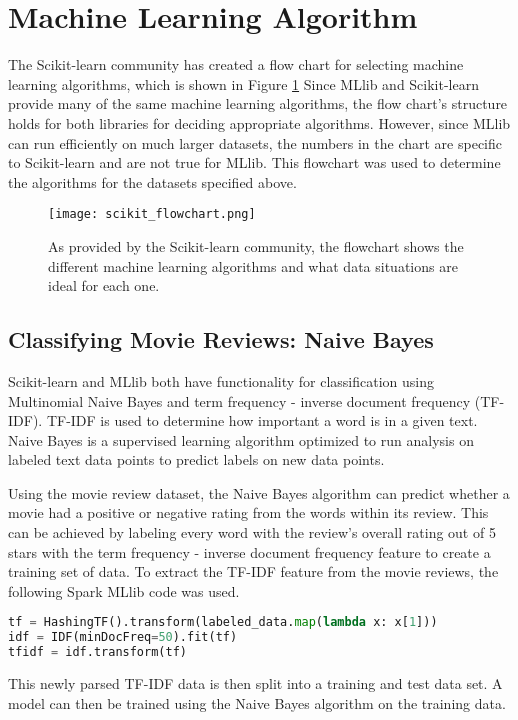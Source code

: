 \documentclass[9pt,twocolumn,twoside]{idsi}
\begin{document}
\section{Machine Learning Algorithm}
The Scikit-learn community has created a flow chart for selecting machine learning algorithms, which is shown in Figure \ref{fig:flowchart} \cite{scimap} Since MLlib and Scikit-learn provide many of the same machine learning algorithms, the flow chart's structure holds for both libraries for deciding appropriate algorithms. However, since MLlib can run efficiently on much larger datasets, the numbers in the chart are specific to Scikit-learn and are not true for MLlib. This flowchart was used to determine the algorithms for the datasets specified above. 
\begin{figure}[htbp]
\centering
\texttt{[image: scikit\_flowchart.png]}
\caption{As provided by the Scikit-learn community, the flowchart shows the different machine learning algorithms and what data situations are ideal for each one.}
\label{fig:flowchart}
\end{figure}

\subsection{Classifying Movie Reviews: Naive Bayes}
Scikit-learn and MLlib both have functionality for classification using Multinomial Naive Bayes and term frequency - inverse document frequency (TF-IDF). TF-IDF is used to determine how important a word is in a given text. Naive Bayes is a supervised learning algorithm optimized to run analysis on labeled text data points to predict labels on new data points.

Using the movie review dataset, the Naive Bayes algorithm can predict whether a movie had a positive or negative rating from the words within its review. This can be achieved by labeling every word with the review's overall rating out of 5 stars with the term frequency - inverse document frequency feature to create a training set of data. To extract the TF-IDF feature from the movie reviews, the following Spark MLlib code was used. 

\begin{lstlisting}[language=Python, breaklines=true]
tf = HashingTF().transform(labeled_data.map(lambda x: x[1]))
idf = IDF(minDocFreq=50).fit(tf)
tfidf = idf.transform(tf)
\end{lstlisting}

This newly parsed TF-IDF data is then split into a training and test data set. A model can then be trained using the Naive Bayes algorithm on the training data.
\end{document}
